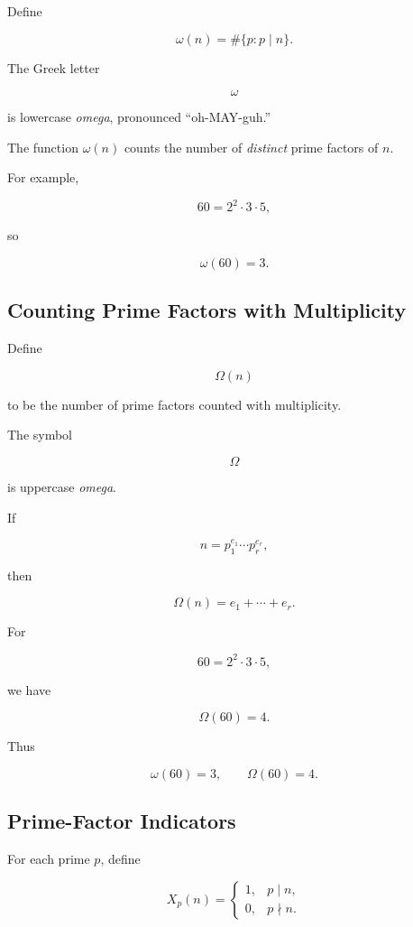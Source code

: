 Define

\[ \omega(n)=\#\{p:p\mid n\}. \]

The Greek letter

\[ \omega \]

is lowercase \emph{omega}, pronounced ``oh-MAY-guh.''

The function \(\omega(n)\) counts the number of \emph{distinct} prime factors
of \(n\).

For example,

\[ 60=2^2\cdot3\cdot5, \]

so

\[ \boxed{\omega(60)=3.} \]

\subsection{Counting Prime Factors with Multiplicity}
\label{subsec:big-omega-prime-factors}

Define

\[ \Omega(n) \]

to be the number of prime factors counted with multiplicity.

The symbol

\[ \Omega \]

is uppercase \emph{omega}.

If

\[ n=p_1^{e_1}\cdots p_r^{e_r}, \]

then

\[ \boxed{\Omega(n)=e_1+\cdots+e_r.} \]

For

\[ 60=2^2\cdot3\cdot5, \]

we have

\[ \boxed{\Omega(60)=4.} \]

Thus

\[ \omega(60)=3,\qquad\Omega(60)=4. \]

\subsection{Prime-Factor Indicators}
\label{subsec:prime-factor-indicators}

For each prime \(p\), define

\[
X_p(n)=
\begin{cases}
1, & p\mid n,\\
0, & p\nmid n.
\end{cases}
\]

